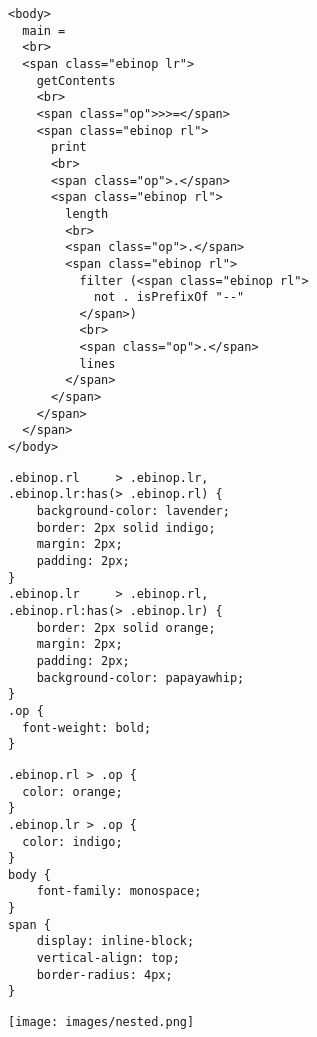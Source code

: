 \documentclass[acmsmall, screen]{acmart}
\begin{document}
\begin{figure}[h]
\begin{minipage}[t]{.57\textwidth}
\end{minipage} 

\bigskip
\bigskip
\begin{minipage}[t]{.42\textwidth} 
\begin{Verbatim}[commandchars=\\\{\}]
<body>
  main =
  <br>
  <span class="ebinop lr">
    getContents
    <br>
    <span class="op">>>=</span>
    <span class="ebinop rl">
      print
      <br>
      <span class="op">.</span>
      <span class="ebinop rl">
        length
        <br>
        <span class="op">.</span>
        <span class="ebinop rl">
          filter (<span class="ebinop rl">
            not . isPrefixOf "--"
          </span>)
          <br>
          <span class="op">.</span>
          lines
        </span>
      </span>
    </span>
  </span>
</body>
\end{Verbatim}
\end{minipage}\begin{minipage}[t]{.59\textwidth} \begin{minipage}[t]{.5\textwidth} 
\begin{Verbatim}
.ebinop.rl     > .ebinop.lr,
.ebinop.lr:has(> .ebinop.rl) {
    background-color: lavender;
    border: 2px solid indigo;
    margin: 2px;
    padding: 2px;
}
.ebinop.lr     > .ebinop.rl,
.ebinop.rl:has(> .ebinop.lr) {
    border: 2px solid orange;
    margin: 2px;
    padding: 2px;
    background-color: papayawhip;
}
.op {
  font-weight: bold;
}
\end{Verbatim}
  \end{minipage} \begin{minipage}[t]{.49\textwidth} \vspace{0.11in}
\begin{Verbatim}
.ebinop.rl > .op {
  color: orange;
}
.ebinop.lr > .op {
  color: indigo;
}
body {
    font-family: monospace;
}
span {
    display: inline-block;
    vertical-align: top;
    border-radius: 4px;
}
\end{Verbatim}
  \end{minipage}
  \vspace{0.05in}
  \texttt{[image: images/nested.png]}
\end{minipage}










\end{figure}
 
\end{document}
